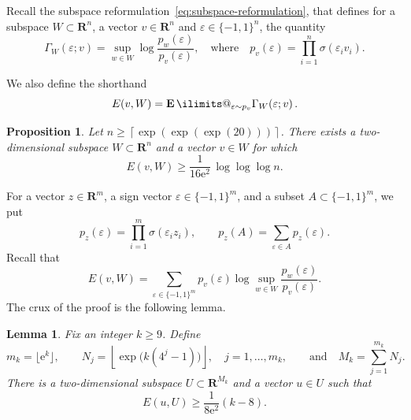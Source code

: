 \documentclass[11pt, letterpaper, hidelinks]{article}
\makeatletter
\newcommand{\R}{\mathbf R}
\newcommand{\ceil}[1]{\left\lceil #1 \right\rceil}
\newcommand{\e}{\mathrm{e}}
\newcommand{\1}{\mathbf 1}
\newcommand{\eps}{\varepsilon}
\renewcommand{\geq}{\geqslant}
\newcommand{\E}{\operatorname*{\mathbf{E}}\ilimits@}
\theoremstyle{plain}
\newtheorem{lemma}{Lemma}[section]
\newtheorem{proposition}{Proposition}[section]
\theoremstyle{definition}
\newcommand{\defn}{=}
\makeatother
\begin{document}
Recall the subspace reformulation~\eqref{eq:subspace-reformulation}, that defines for a subspace $W \subset \R^n$, a vector $v \in \R^n$ and $\eps \in \{-1,1\}^n$, the quantity
\begin{equation}
\Gamma_W(\eps; v)
	= \sup_{w \in W} \log \frac{p_w(\eps)}{p_v(\eps)},
		\quad \mbox{where} \quad
	p_v(\eps) = \prod_{i=1}^n \sigma(\eps_i v_i).
\end{equation}

We also define the shorthand
\begin{equation}
\label{eq:expect-short}
E(v, W) = \E_{\eps \sim p_v} \Gamma_W(\eps; v) \, .
\end{equation}



\begin{proposition}
\label{prop:d2-logloglog-lower}
Let $n \geq \ceil{\exp(\exp(\exp(20)))}$. There exists a two-dimensional subspace $W \subset \R^n$ and a vector $v \in W$ for which
\[
E(v,W) \geq \frac{1}{16 \e^2} \, \log \log \log n.
\]
\end{proposition}

For a vector \(z \in \R^m\), a sign vector \(\eps \in \{-1,1\}^m\), and a subset $A \subset \{-1, 1\}^m$, we put
\[
p_z(\eps) \defn \prod_{i=1}^m \sigma(\eps_i z_i),
\qquad
p_z(A) \defn \sum_{\eps \in A} p_z(\eps).
\]
Recall that
\[
E(v,W) = \sum_{\eps \in \{-1,1\}^m} p_v(\eps) \log \sup_{w \in W} \frac{p_w(\eps)}{p_v(\eps)}.
\]
The crux of the proof is the following lemma. 
\begin{lemma}
\label{lem:a-single-block}
Fix an integer $k \geq 9$. Define 
\[
m_k \defn \lfloor \e^k \rfloor,
\qquad
N_{j} \defn \left\lfloor \exp\big(k(4^j-1)\big)\right\rfloor,
\quad j=1,\dots,m_k, 
\qquad \mbox{and} \quad 
M_k \defn \sum_{j=1}^{m_k} N_{j}.
\]
There is a two-dimensional subspace $U \subset \R^{M_k}$ and a vector $u \in U$ such that
\begin{equation}
\label{eq:Ek-lower-claim}
E(u,U) \geq \frac{1}{8\e^2}(k-8).
\end{equation}
\end{lemma}
\end{document}
